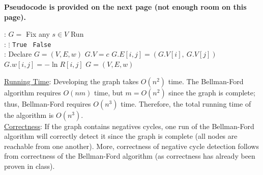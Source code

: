 \documentclass[twoside,11pt]{homework}
\newcommand\NoProc{\renewcommand\algorithmicprocedure{}}
\begin{document}
\noindent
\textbf{Pseudocode is provided on the next page (not enough room on this page).}\\
\begin{algorithm}
\begin{algorithmic}[1]
\NoProc
{}:  
\State $ G = $    
\State Fix any $s \in V$
\State Run    
\EndProcedure  \\

\NoProc
{}:  
\State $\vdots$
\State \Return \texttt{True}   
\Else \ \Return \texttt{False}  
\EndIf
\EndFor
\EndProcedure  \\

\NoProc
{}:   
\State Declare $G = (V, E, w)$ 
\State $G.V = c$
\State $G.E[i,j] = (G.V[i],  \ G.V[j])$
\State $G.w[i, j] = -\ln R[i, j]$ 
\EndFor
\EndFor
\State \Return $G = (V, E, w)$
\EndProcedure 
\end{algorithmic}
\end{algorithm}

\noindent
\underline{Running Time}: Developing the graph takes $O(n^2)$ time.  The Bellman-Ford algorithm requires $O(nm)$ time,  but $m = O(n^2)$ since the graph is complete; thus, Bellman-Ford requires $O(n^3)$ time. Therefore, the total running time of the algorithm is $O(n^3)$.   \\


\noindent
\underline{Correctness}: If the graph contains negatives cycles,  one run of the Bellman-Ford algorithm will correctly detect it since the graph is complete (all nodes are reachable from one another).  More,  correctness of negative cycle detection follows from correctness of the Bellman-Ford algorithm (as correctness has already been proven in class).  %
\end{document}
